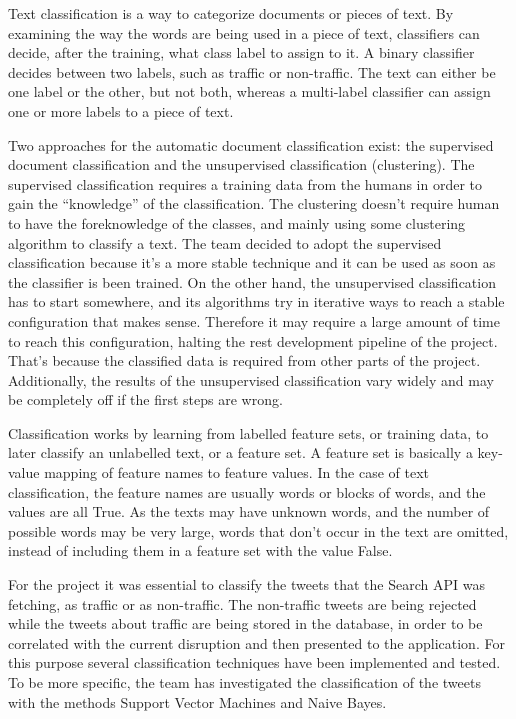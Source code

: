 Text classification is a way to categorize documents or pieces of text. By examining the way the words are being used in a piece of text, classifiers can decide, after the training, what class label to assign to it. A binary classifier decides between two labels, such as traffic or non-traffic. The text can either be one label or the other, but not both, whereas a multi-label classifier can assign one or more labels to a piece of text. 

Two approaches for the automatic document classification exist: the supervised document classification and the unsupervised classification (clustering). The supervised classification requires a training data from the humans in order to gain the “knowledge” of the classification. The clustering doesn’t require human to have the foreknowledge of the classes, and mainly using some clustering algorithm to classify a text. The team decided to adopt the supervised classification because it’s a more stable technique and it can be used as soon as the classifier is been trained. On the other hand, the unsupervised classification has to start somewhere, and its algorithms try in iterative ways to reach a stable configuration that makes sense. Therefore it may require a large amount of time to reach this configuration, halting the rest development pipeline of the project. That’s because the classified data is required from other parts of the project. Additionally, the results of the unsupervised classification vary widely and may be completely off if the first steps are wrong.

Classification works by learning from labelled feature sets, or training data, to later classify an unlabelled text, or a feature set. A feature set is basically a key-value mapping of feature names to feature values. In the case of text classification, the feature names are usually words or blocks of words, and the values are all True. As the texts may have unknown words, and the number of possible words may be very large, words that don't occur in the text are omitted, instead of including them in a feature set with the value False.

For the project it was essential to classify the tweets that the Search API was fetching, as traffic or as non-traffic. The non-traffic tweets are being rejected while the tweets about traffic are being stored in the database, in order to be correlated with the current disruption and then presented to the application. For this purpose several classification techniques have been implemented and tested. To be more specific, the team has investigated the classification of the tweets with the methods Support Vector Machines and Naive Bayes. 

